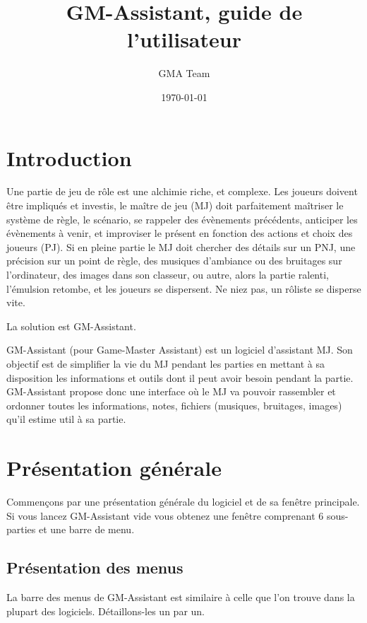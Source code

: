 \documentclass[a4paper,12pt]{article}
\title{GM-Assistant, guide de l'utilisateur}
\author{GMA Team}
\date{\today}
\begin{document}
\maketitle

\tableofcontents

\section{Introduction}
Une partie de jeu de rôle est une alchimie riche, et complexe. Les joueurs doivent être impliqués et investis, le maître de jeu (MJ) doit parfaitement maîtriser le système de règle, le scénario, se rappeler des évènements précédents, anticiper les évènements à venir, et improviser le présent en fonction des actions et choix des joueurs (PJ).
Si en pleine partie le MJ doit chercher des détails sur un PNJ, une précision sur un point de règle, des musiques d'ambiance ou des bruitages sur l'ordinateur, des images dans son classeur, ou autre, alors la partie ralenti, l'émulsion retombe, et les joueurs se dispersent. Ne niez pas, un rôliste se disperse vite.

La solution est GM-Assistant.

GM-Assistant (pour Game-Master Assistant) est un logiciel d'assistant MJ. Son objectif est de simplifier la vie du MJ pendant les parties en mettant à sa disposition les informations et outils dont il peut avoir besoin pendant la partie.
GM-Assistant propose donc une interface où le MJ va pouvoir rassembler et ordonner toutes les informations, notes, fichiers (musiques, bruitages, images) qu'il estime util à sa partie.

\section{Présentation générale}
Commençons par une présentation générale du logiciel et de sa fenêtre principale.
Si vous lancez GM-Assistant vide vous obtenez une fenêtre comprenant 6 sous-parties et une barre de menu.
\subsection{Présentation des menus}\label{menu}
La barre des menus de GM-Assistant est similaire à celle que l'on trouve dans la plupart des logiciels. Détaillons-les un par un.
\end{document}
